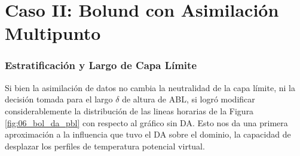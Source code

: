 \vspace*{\fill}
\newpage





























\section{Caso II: Bolund con Asimilación Multipunto}
\subsubsection{Estratificación y Largo de Capa Límite}
Si bien la asimilación de datos no cambia la neutralidad de la capa límite, ni la decisión tomada para el largo $\delta$ de altura de ABL, si logró modificar considerablemente la distribución de las lineas horarias  de la Figura \ref{fig:06_bol_da_pbl} con respecto al gráfico sin DA. Esto nos da una primera aproximación a la influencia que tuvo el DA sobre el dominio, la capacidad de desplazar los perfiles de temperatura potencial virtual.


